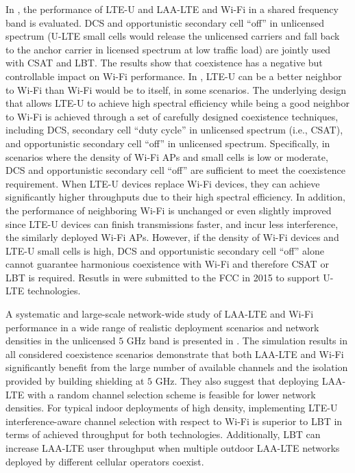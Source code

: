 In \cite{U-LTE-Wi-Fi-Qualcomm-2014, LTE-U-Wi-Fi-LTE-U-Forum-2015, LTE-U-Qualcomm-2015, U-LTE-Wi-Fi-Qualcomm-FCC-2015}, the performance of LTE-U and LAA-LTE and Wi-Fi in a shared frequency band is evaluated. DCS and opportunistic secondary cell ``off'' in unlicensed spectrum (U-LTE small cells would release the unlicensed carriers and fall back to the anchor carrier in licensed spectrum at low traffic load) are jointly used with CSAT and LBT. The results show that coexistence has a negative but controllable impact on Wi-Fi performance. In \cite{U-LTE-Wi-Fi-Qualcomm-2014, LTE-U-Wi-Fi-LTE-U-Forum-2015, LTE-U-Qualcomm-2015}, LTE-U can be a better neighbor to Wi-Fi than Wi-Fi would be to itself, in some scenarios. The underlying design that allows LTE-U to achieve high spectral efficiency while being a good neighbor to Wi-Fi is achieved through a set of carefully designed coexistence techniques, including DCS, secondary cell ``duty cycle'' in unlicensed spectrum (i.e., CSAT), and opportunistic secondary cell ``off'' in unlicensed spectrum. Specifically, in scenarios where the density of Wi-Fi APs and small cells is low or moderate, DCS and opportunistic secondary cell ``off'' are sufficient to meet the coexistence requirement. When LTE-U devices replace Wi-Fi devices, they can achieve significantly higher throughputs due to their high spectral efficiency. In addition, the performance of neighboring Wi-Fi is unchanged or even slightly improved since LTE-U devices can finish transmissions faster, and incur less interference, the similarly deployed Wi-Fi APs. However, if the density of Wi-Fi devices and LTE-U small cells is high, DCS and opportunistic secondary cell ``off'' alone cannot guarantee harmonious coexistence with Wi-Fi and therefore CSAT or LBT is required. Resutls in \cite{LTE-U-Wi-Fi-LTE-U-Forum-2015, U-LTE-Wi-Fi-Qualcomm-FCC-2015} were submitted to the FCC in 2015 to support U-LTE technologies.

A systematic and large-scale network-wide study of LAA-LTE and Wi-Fi performance in a wide range of realistic deployment scenarios and network densities in the unlicensed $5$ GHz band is presented in \cite{LTE-U-ICC-WS-2015}. The simulation results in all considered coexistence scenarios demonstrate that both LAA-LTE and Wi-Fi significantly benefit from the large number of available channels and the isolation provided by building shielding at $5$ GHz. They also suggest that deploying LAA-LTE with a random channel selection scheme is feasible for lower network densities. For typical indoor deployments of high density, implementing LTE-U interference-aware channel selection with respect to Wi-Fi is superior to LBT in terms of achieved throughput for both technologies. Additionally, LBT can increase LAA-LTE user throughput when multiple outdoor LAA-LTE networks deployed by different cellular operators coexist.

